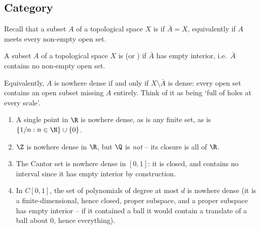 \subsection{Category}

Recall that a subset $A$ of a topological space $X$ is  if $\bar A = X$, equivalently if $A$ meets every non-empty open set.

\begin{definition}
	A subset $A$ of a topological space $X$ is  (or ) if $\bar A$ has empty interior, i.e.\ $\bar A$ contains no non-empty open set.
\end{definition}

Equivalently, $A$ is nowhere dense if and only if $X \setminus \bar A$ is dense: every open set contains an open subset missing $A$ entirely. Think of it as being `full of holes at every scale'.

\begin{example}
	\begin{enumerate}[label=(\roman*)]
		\item A single point in $\R$ is nowhere dense, as is any finite set, as is $\{1/n : n \in \N\} \cup \{0\}$.
		\item $\Z$ is nowhere dense in $\R$, but $\Q$ is \emph{not} -- its closure is all of $\R$.
		\item The Cantor set is nowhere dense in $[0,1]$: it is closed, and contains no interval since it has empty interior by construction.
		\item In $C[0,1]$, the set of polynomials of degree at most $d$ is nowhere dense (it is a finite-dimensional, hence closed, proper subspace, and a proper subspace has empty interior -- if it contained a ball it would contain a translate of a ball about $0$, hence everything).
	\end{enumerate}
\end{example}

\begin{center}
\end{center}

